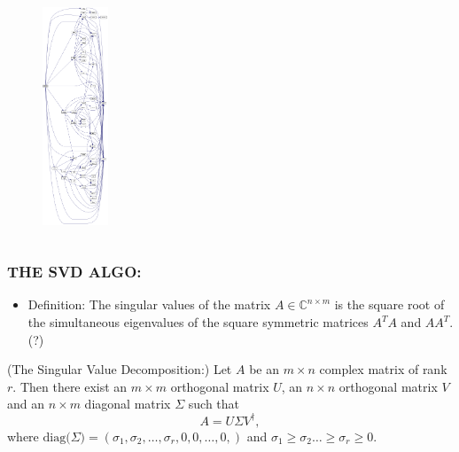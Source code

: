 \documentclass[a4paper,8pt]{beamer} %
\newcommand{\diag}[1]{\text{diag}{#1}}
\begin{document}
\begin{frame}
\begin{columns}[l]
%
\column{2.8cm}
%
\begin{figure}%
\begin{center}
\includegraphics[height=6.5cm]{callg_dsyev.png} 
\end{center}
\end{figure}
%
\end{columns}
\end{frame}%

\begin{frame} %
\frametitle{THE SVD ALGO:}
\begin{itemize}
	\item Definition: 
				The singular values of the matrix $A\in\mathbb C^{n\times m}$ is the 
				square root of the simultaneous eigenvalues of the square symmetric matrices $A^TA$ and $AA^T$. (?)
\end{itemize}
		\begin{theorem}(The Singular Value Decomposition:)
			Let $A$ be an $m\times n$ complex matrix of rank $r$. Then there exist an $m\times m$
			orthogonal matrix $U$, an $n\times n$ orthogonal matrix $V$ and an $n\times m$ diagonal 
			matrix $\Sigma$ such that 
			\begin{equation}
				A = U \Sigma V^\dagger,
			\end{equation}
			where $\diag (\Sigma) = (\sigma_1,\sigma_2,\dots,\sigma_r, 0,0,\dots,0,)$ and 
			$\sigma_1\ge\sigma_2\dots\ge\sigma_r\ge0$.
		\end{theorem}
\end{frame}%
\end{document}
